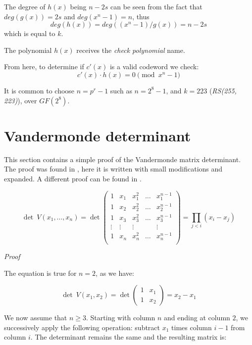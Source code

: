 \documentclass[a4paper]{article}
\theoremstyle{definition}
\begin{document}
The degree of $h(x)$ being $n-2s$ can be seen from the fact that $deg(g(x))=2s$ and $deg(x^n -1)=n$, thus
$$deg(h(x)) = deg((x^n -1)/g(x))=n-2s$$
which is equal to $k$.

The polynomial $h(x)$ receives the \emph{check polynomial} name.

From here, to determine if $c'(x)$ is a valid codeword we check:
$$c'(x) \cdot h(x) = 0 \pmod{x^n - 1}$$


It is common to choose $n = p^r -1$ such as $n=2^8 - 1$, and $k=223$ (\emph{RS(255, 223)}), over $GF(2^8)$. 







\newpage

\appendix
\section{Vandermonde determinant}
\label{sec:vandermondedet}

This section contains a simple proof of the Vandermonde matrix determinant. The proof was found in \cite{vanddetproof}, here it is written with small modifications and expanded. A different proof can be found in \cite{vanddetproof2}.

$$
\det~V(x_1, ..., x_n) = \det
\begin{pmatrix}
    1 & x_1 & x_1^2 & \ldots & x_1^{n-1} \\
    1 & x_2 & x_2^2 & \ldots & x_2^{n-1} \\
    1 & x_3 & x_3^2 & \ldots & x_3^{n-1} \\
    \vdots & \vdots & \vdots &  & \vdots\\
    1 & x_n & x_n^2 & \ldots & x_n^{n-1} \\
\end{pmatrix}
= \prod_{j < i} (x_i - x_j)
$$

\emph{Proof}

The equation is true for $n = 2$, as we have:

$$
\det~V(x_1, x_2) = \det
\begin{pmatrix}
    1 & x_1\\
    1 & x_2
\end{pmatrix}
= x_2 - x_1
$$

We now assume that $n \ge 3$. Starting with column $n$ and ending at column $2$, we successively apply the following operation: subtract $x_1$ times column $i-1$ from column $i$. The determinant remains the same and the resulting matrix is:
\end{document}

